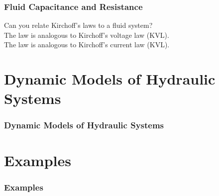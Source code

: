 \documentclass{beamer}                  %
\newcommand{\sectiontitleIII}{Fluid Capacitance and Resistance}
\newcommand{\sectiontitleIV}{Dynamic Models of Hydraulic Systems}
\newcommand{\sectiontitleV}{Examples}
\begin{document}
	\begin{frame} \small
		\frametitle{\sectiontitleIII}

		Can you relate Kirchoff's laws to a fluid system? \vspace {10mm}\\

		The \underline{\hspace{20mm}} law is analogous to Kirchoff's voltage law (KVL).  \vspace {10mm}\\


		The \underline{\hspace{20mm}} law is analogous to Kirchoff's current law (KVL).

			
	\end{frame}	

\section{\sectiontitleIV}

	\begin{frame}[label=sectionIV] \small
		\frametitle{\sectiontitleIV}
		
	\end{frame}	

\section{\sectiontitleV}

	\begin{frame}[label=sectionV] \small
		\frametitle{\sectiontitleV}
		
	\end{frame}	
\end{document}

